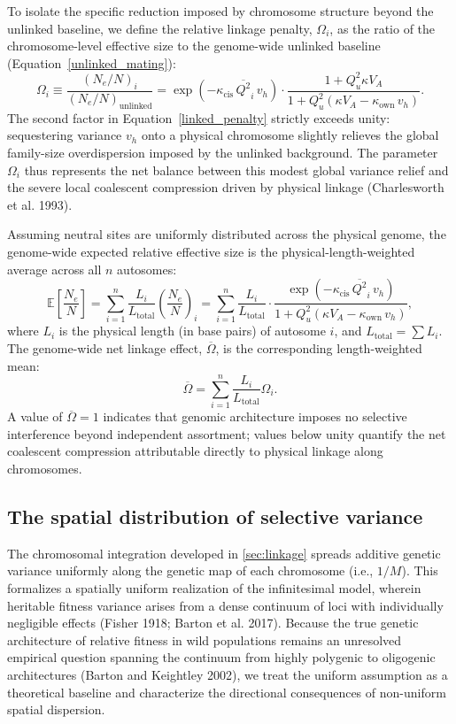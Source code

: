 \documentclass[12pt]{article}
\begin{document}
To isolate the specific reduction imposed by chromosome structure beyond the unlinked baseline, we define the relative linkage penalty, $\Omega_i$, as the ratio of the chromosome-level effective size to the genome-wide unlinked baseline (Equation~\eqref{unlinked_mating}):
\begin{equation}
    \Omega_i \equiv \frac{(N_e/N)_i}{(N_e/N)_\text{unlinked}} = \exp\left(-\kappa_\text{cis}\,\overline{Q^2}_i\,v_h\right) \cdot \frac{1 + Q_u^2\kappa V_A}{1 + Q_u^2(\kappa V_A - \kappa_\text{own}\,v_h)}. \label{linked_penalty}
\end{equation}
The second factor in Equation~\eqref{linked_penalty} strictly exceeds unity: sequestering variance $v_h$ onto a physical chromosome slightly relieves the global family-size overdispersion imposed by the unlinked background. The parameter $\Omega_i$ thus represents the net balance between this modest global variance relief and the severe local coalescent compression driven by physical linkage (Charlesworth et al. 1993).

Assuming neutral sites are uniformly distributed across the physical genome, the genome-wide expected relative effective size is the physical-length-weighted average across all $n$ autosomes:
\begin{equation}
    \mathbb{E}\left[\frac{N_e}{N}\right] = \sum_{i=1}^{n} \frac{L_i}{L_\text{total}} \left(\frac{N_e}{N}\right)_i = \sum_{i=1}^{n} \frac{L_i}{L_\text{total}} \cdot \frac{\exp\left(-\kappa_\text{cis}\,\overline{Q^2}_i\,v_h\right)}{1 + Q_u^2(\kappa V_A - \kappa_\text{own}\,v_h)},
\end{equation}
where $L_i$ is the physical length (in base pairs) of autosome $i$, and $L_\text{total} = \sum L_i$. The genome-wide net linkage effect, $\overline{\Omega}$, is the corresponding length-weighted mean:
\begin{equation}
    \overline{\Omega} = \sum_{i=1}^{n} \frac{L_i}{L_\text{total}} \Omega_i.
\end{equation}
A value of $\overline{\Omega} = 1$ indicates that genomic architecture imposes no selective interference beyond independent assortment; values below unity quantify the net coalescent compression attributable directly to physical linkage along chromosomes.

\subsection{The spatial distribution of selective variance}\label{sec:spatial_variance}
The chromosomal integration developed in \autoref{sec:linkage} spreads additive genetic variance uniformly along the genetic map of each chromosome (i.e., $1/M$). This formalizes a spatially uniform realization of the infinitesimal model, wherein heritable fitness variance arises from a dense continuum of loci with individually negligible effects (Fisher 1918; Barton et al. 2017). Because the true genetic architecture of relative fitness in wild populations remains an unresolved empirical question spanning the continuum from highly polygenic to oligogenic architectures (Barton and Keightley 2002), we treat the uniform assumption as a theoretical baseline and characterize the directional consequences of non-uniform spatial dispersion.
\end{document}
